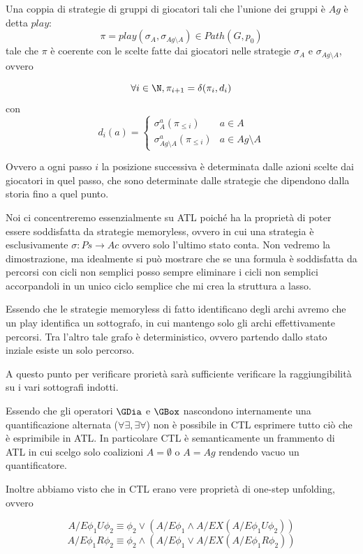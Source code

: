 Una coppia di strategie di gruppi di giocatori tali che l'unione dei gruppi è \(Ag\) è detta \(play\):
\[\pi = play(\sigma_A,\sigma_{Ag\setminus A}) \in Path(G,p_0)\]
tale che \(\pi\) è coerente con le scelte fatte dai giocatori nelle strategie \(\sigma_A\) e \(\sigma_{Ag\setminus A}\), ovvero

\[\forall i \in \N, \pi_{i+1} = \delta(\pi_i, d_i)\]
con
\[d_i(a) = \begin{cases}
  \sigma_A^a(\pi_{\leq i}) & a \in A \\
  \sigma_{Ag\setminus A}^a(\pi_{\leq i}) & a \in Ag\setminus A
\end{cases}\]

Ovvero a ogni passo \(i\) la posizione successiva è determinata dalle azioni scelte dai giocatori in quel passo, che sono determinate dalle strategie che dipendono dalla storia fino a quel punto.

Noi ci concentreremo essenzialmente su ATL poiché ha la proprietà di poter essere soddisfatta da strategie memoryless, ovvero in cui una strategia è esclusivamente \(\sigma: Ps\to Ac\) ovvero solo l'ultimo stato conta. Non vedremo la dimostrazione, ma idealmente si può mostrare che se una formula è soddisfatta da percorsi con cicli non semplici posso sempre eliminare i cicli non semplici accorpandoli in un unico ciclo semplice che mi crea la struttura a lasso.

Essendo che le strategie memoryless di fatto identificano degli archi avremo che un play identifica un sottografo, in cui mantengo solo gli archi effettivamente percorsi. Tra l'altro tale grafo è deterministico, ovvero partendo dallo stato inziale esiste un solo percorso.

A questo punto per verificare prorietà sarà sufficiente verificare la raggiungibilità su i vari sottografi indotti.

Essendo che gli operatori \(\GDia\) e \(\GBox\) nascondono internamente una quantificazione alternata (\(\forall\exists, \exists\forall\)) non è possibile in CTL esprimere tutto ciò che è esprimibile in ATL. In particolare CTL è semanticamente un frammento di ATL in cui scelgo solo coalizioni \(A=\emptyset\) o \(A = Ag\) rendendo vacuo un quantificatore.

Inoltre abbiamo visto che in CTL erano vere proprietà di one-step unfolding, ovvero

\[A/E \phi_1 U \phi_2 \equiv \phi_2 \lor (A/E \phi_1 \land A/E X(A/E \phi_1 U \phi_2))\]
\[A/E \phi_1 R \phi_2 \equiv \phi_2 \land (A/E \phi_1 \lor A/E X(A/E \phi_1 R \phi_2))\]

